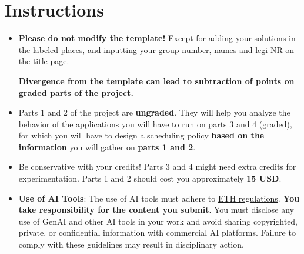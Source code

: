 \documentclass[11pt]{article}
\begin{document}



\section*{Instructions}

\begin{itemize}
    \item {\color{red}\textbf{Please do not modify the template!}} Except for adding your solutions in the labeled places, and inputting your group number, names and legi-NR on the title page. 
    
    \textbf{Divergence from the template can lead to subtraction of points on graded parts of the project.}
    
    \item Parts 1 and 2 of the project are \textbf{ungraded}. They will help you analyze the behavior of the applications you will have to run on parts 3 and 4 (graded), for which you will have to design a scheduling policy \textbf{based on the information} you will gather on \textbf{parts 1 and 2}.

    \item Be conservative with your credits! Parts 3 and 4 might need extra credits for experimentation. Parts 1 and 2 should cost you approximately \textbf{15 USD}. %

    \item \textbf{Use of AI Tools}: The use of AI tools must adhere to \href{https://ethz.ch/staffnet/en/news-and-events/internal-news/archive/2024/07/new-guidelines-for-the-use-of-generative-ai-in-education.html}{ETH regulations}. \textbf{You take responsibility for the content you submit}. You must disclose any use of GenAI and other AI tools in your work and avoid sharing copyrighted, private, or confidential information with commercial AI platforms. Failure to comply with these guidelines may result in disciplinary action.

\end{itemize}

\newpage





\newcommand{\colored}[1]{\textcolor{#1}{#1}}
\newcommand{\coloredcell}[1]{\cellcolor{#1} #1}



\end{document}
